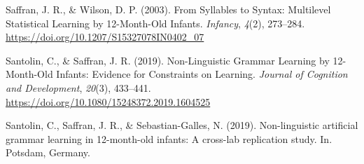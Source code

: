 \documentclass[english,man,man,floatsintext]{apa6}
\begin{document}
\begin{appendix}
\leavevmode\hypertarget{ref-saffran2003}{}%
Saffran, J. R., \& Wilson, D. P. (2003). From Syllables to Syntax:
Multilevel Statistical Learning by 12-Month-Old Infants. \emph{Infancy},
\emph{4}(2), 273--284. \url{https://doi.org/10.1207/S15327078IN0402_07}

\leavevmode\hypertarget{ref-santolin2019}{}%
Santolin, C., \& Saffran, J. R. (2019). Non-Linguistic Grammar Learning
by 12-Month-Old Infants: Evidence for Constraints on Learning.
\emph{Journal of Cognition and Development}, \emph{20}(3), 433--441.
\url{https://doi.org/10.1080/15248372.2019.1604525}

\leavevmode\hypertarget{ref-santolin2019a}{}%
Santolin, C., Saffran, J. R., \& Sebastian-Galles, N. (2019).
Non-linguistic artificial grammar learning in 12-month-old infants: A
cross-lab replication study. In. Potsdam, Germany.

\endgroup
\end{appendix}
\end{document}
